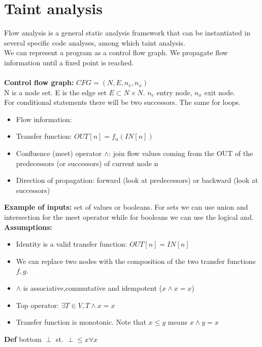 \documentclass[10pt,a4paper]{article}
\begin{document}
\section{Taint analysis}
Flow analysis is a general static analysis framework that can be instantiated in several specific code analyses, among which taint analysis.\\
We can represent a program as a control flow graph. We propagate flow information until a fixed point is reached.\\\\
\textbf{Control flow graph:} $CFG = (N,E,n_e,n_x)$\\
N is a node set. E is the edge set $E \subset N \times N$. $n_e$ entry node, $n_x$ exit node.\\
For conditional statements there will be two successors. The same for loops.
\begin{itemize}
\item Flow information: 
\item Transfer function: $OUT[n]= f_n(IN[n])$
\item Confluence (meet) operator $\wedge$: join flow values coming from the OUT of the predecessors (or successors) of current node n
\item Direction of propagation: forward (look at predecessors) or backward (look at successors)
\end{itemize}
\textbf{Example of inputs:} set of values or booleans. For sets we can use union and intersection for the meet operator while for booleans we can use the logical and.\\
\textbf{Assumptions:}
\begin{itemize}
\item Identity is a valid transfer function: $OUT[n] = IN[n]$\\
\item We can replace two nodes with the composition of the two transfer functions $f,g$.\\
\item $\wedge$ is associative,commutative and idempotent ($x \wedge x = x$)\\
\item Top operator: $\exists T \in V,T \wedge x = x$\\
\item Transfer function is monotonic. Note that $x \leq y$ means $x \wedge y = x$
\end{itemize}
\textbf{Def} bottom $\perp$ st. $\perp \leq x \forall x$\\
\end{document}
